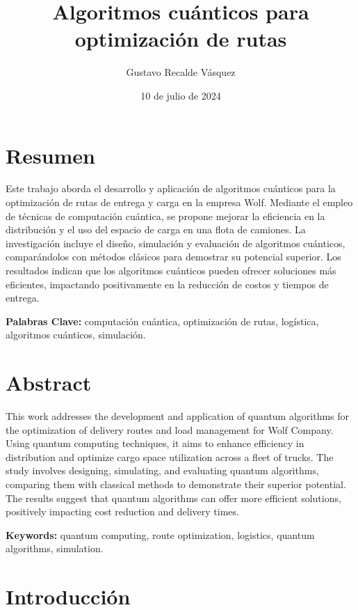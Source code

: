 \documentclass[11pt,a4paper,spanish]{book}
\title{ Algoritmos cuánticos para optimización de rutas}
\author{ Gustavo Recalde Vásquez}
\date{ 10 de julio de 2024}
\begin{document}
\renewcommand{\listfigurename}{Índice de Ilustraciones}
\renewcommand{\listtablename}{Índice de Tablas}
\renewcommand{\contentsname}{Índice de Contenidos}
\renewcommand{\figurename}{Figura}
\renewcommand{\tablename}{Tabla} 

\maketitle
\frontmatter
\tableofcontents
\listoffigures
\listoftables

\chapter{Resumen}

Este trabajo aborda el desarrollo y aplicación de algoritmos cuánticos para la optimización de rutas de entrega y carga en la empresa Wolf. Mediante el empleo de técnicas de computación cuántica, se propone mejorar la eficiencia en la distribución y el uso del espacio de carga en una flota de camiones. La investigación incluye el diseño, simulación y evaluación de algoritmos cuánticos, comparándolos con métodos clásicos para demostrar su potencial superior. Los resultados indican que los algoritmos cuánticos pueden ofrecer soluciones más eficientes, impactando positivamente en la reducción de costos y tiempos de entrega.

{\bf Palabras Clave:} computación cuántica, optimización de rutas, logística, algoritmos cuánticos, simulación.


\chapter{Abstract}

This work addresses the development and application of quantum algorithms for the optimization of delivery routes and load management for Wolf Company. Using quantum computing techniques, it aims to enhance efficiency in distribution and optimize cargo space utilization across a fleet of trucks. The study involves designing, simulating, and evaluating quantum algorithms, comparing them with classical methods to demonstrate their superior potential. The results suggest that quantum algorithms can offer more efficient solutions, positively impacting cost reduction and delivery times.

{\bf Keywords:} quantum computing, route optimization, logistics, quantum algorithms, simulation.

\mainmatter
\chapter{Introducción}
\end{document}
